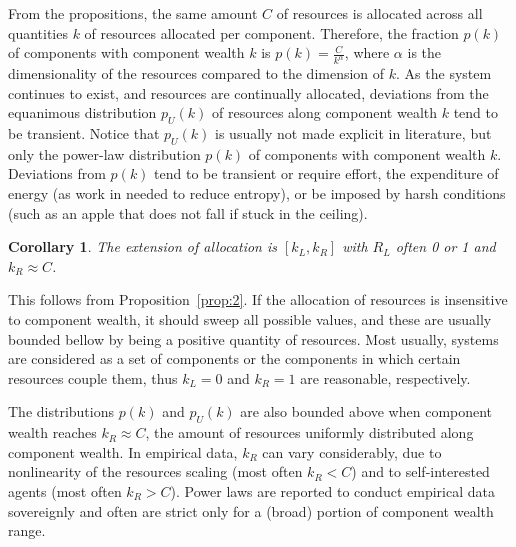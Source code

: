 \documentclass[a4paper, 11pt]{article} %
\newtheorem{corollary}[theorem2]{Corollary}
\begin{document}
From the propositions, the same amount $C$ of resources is allocated
across all quantities $k$ of resources allocated per component.
Therefore, the fraction $p(k)$ of components with component wealth $k$ is
$p(k)=\frac{C}{k^\alpha}$, where $\alpha$ is
the dimensionality of the resources compared to the dimension of $k$.
As the system continues to exist,
and resources are continually allocated, deviations from the equanimous
distribution $p_U(k)$ of resources along component wealth $k$
 tend to be transient.
 Notice that $p_U(k)$ is usually not made explicit in literature, but only
 the power-law distribution $p(k)$ of components
with component wealth $k$.
Deviations from $p(k)$ tend to be transient or require effort, the expenditure of energy (as work in needed to reduce entropy), or be imposed by harsh conditions (such as an apple that does not fall if stuck in the ceiling).


 \begin{corollary}\label{cor:2}
	The extension of allocation is $[k_L,k_R]$ with $R_L$ often 0 or 1 and $k_R\approx C$.
\end{corollary}

This follows from Proposition~\ref{prop:2}.
If the allocation of resources is insensitive to component wealth,
it should sweep all possible values, and these are usually
bounded bellow by being a positive quantity of resources.
Most usually, systems are considered as a set of components
or the components in which certain resources couple them,
thus $k_L=0$ and $k_R=1$ are reasonable, respectively.

The distributions $p(k)$ and $p_U(k)$ are also
bounded above when component wealth reaches $k_R \approx C$,
the amount of resources uniformly distributed along component wealth.
In empirical data, $k_R$ can vary considerably, due to
nonlinearity of the resources scaling (most often $k_R<C$) and
to self-interested agents (most often $k_R>C$).
Power laws are reported to conduct empirical data sovereignly and
often are strict only for a
(broad) portion of component wealth range.

\end{document}
